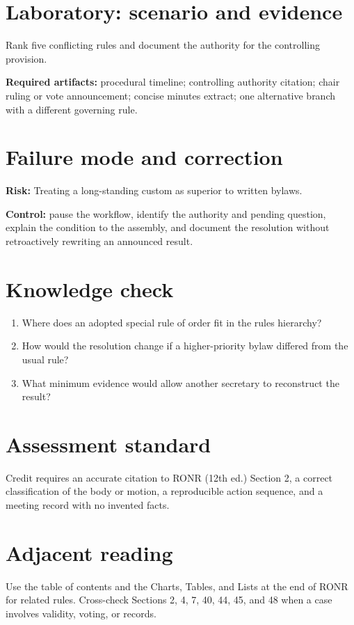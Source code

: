 \documentclass[11pt]{article}
\begin{document}
\section{Laboratory: scenario and evidence}
Rank five conflicting rules and document the authority for the controlling provision.

\textbf{Required artifacts:} procedural timeline; controlling authority citation; chair ruling or vote announcement; concise minutes extract; one alternative branch with a different governing rule.

\section{Failure mode and correction}
\textbf{Risk:} Treating a long-standing custom as superior to written bylaws.

\textbf{Control:} pause the workflow, identify the authority and pending question, explain the condition to the assembly, and document the resolution without retroactively rewriting an announced result.

\section{Knowledge check}
\begin{enumerate}[leftmargin=*,itemsep=4pt]
\item Where does an adopted special rule of order fit in the rules hierarchy?
\item How would the resolution change if a higher-priority bylaw differed from the usual rule?
\item What minimum evidence would allow another secretary to reconstruct the result?
\end{enumerate}

\section{Assessment standard}
Credit requires an accurate citation to RONR (12th ed.) Section 2, a correct classification of the body or motion, a reproducible action sequence, and a meeting record with no invented facts.

\section{Adjacent reading}
Use the table of contents and the Charts, Tables, and Lists at the end of RONR for related rules. Cross-check Sections 2, 4, 7, 40, 44, 45, and 48 when a case involves validity, voting, or records.
\end{document}
